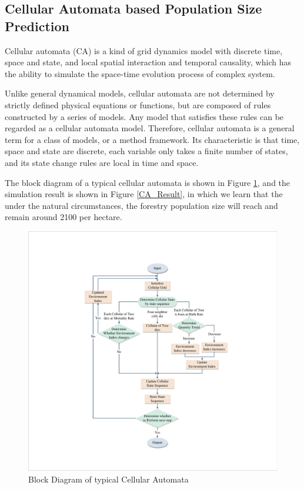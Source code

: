\documentclass{mcmthesis}
\numberwithin{figure}{section}
\numberwithin{table}{section}
\numberwithin{equation}{section}
\begin{document}
\subsection{Cellular Automata based Population Size Prediction}

Cellular automata (CA) is a kind of grid dynamics model with discrete time, 
space and state, and local spatial interaction and temporal causality, which 
has the ability to simulate the space-time evolution process of complex system.
\par
Unlike general dynamical models, cellular automata are not determined by strictly 
defined physical equations or functions, but are composed of rules constructed by 
a series of models. Any model that satisfies these rules can be regarded as a cellular 
automata model. Therefore, cellular automata is a general term for a class of models, 
or a method framework. Its characteristic is that time, space and state are discrete, 
each variable only takes a finite number of states, and its state change rules are local 
in time and space.
\par
The block diagram of a typical cellular automata is shown in Figure \ref{CA_Fig}, 
and the simulation result is shown in Figure \ref{CA_Result}, in which
we learn that the under the natural circumstances, the forestry population size
will reach and remain around 2100 per hectare. 



\begin{figure}[htbp]
  \centering
  \includegraphics[width = 12cm]{code&pic/元胞自动机流程图.pdf}
  \caption{Block Diagram of typical Cellular Automata}\label{CA_Fig}
\end{figure}
\end{document}
